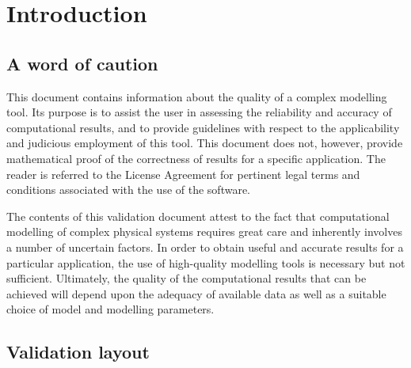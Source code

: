 \chapter{Introduction}
\section{A word of caution}
This document contains information about the quality of a complex modelling tool. Its purpose is to assist the user in assessing the reliability and accuracy of computational results, and to provide guidelines with respect to the applicability and judicious employment of this tool. This document does not, however, provide mathematical proof of the correctness of results for a specific application. The reader is referred to the License Agreement for pertinent legal terms and conditions associated with the use of the software.

The contents of this validation document attest to the fact that computational modelling of complex physical systems requires great care and inherently involves a number of uncertain factors. In order to obtain useful and accurate results for a particular application, the use of high-quality modelling tools is necessary but not sufficient. Ultimately, the quality of the computational results that can be achieved will depend upon the adequacy of available data as well as a suitable choice of model and modelling parameters.
% 
\section{Validation layout}

